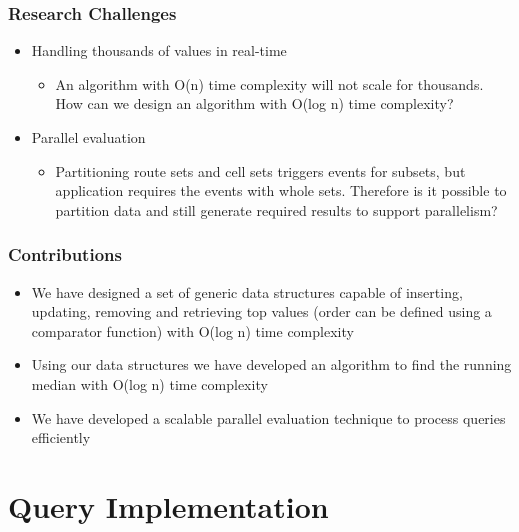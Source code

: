\documentclass[]{beamer}
\begin{document}
\begin{frame}
\frametitle{Research Challenges}
\begin{itemize}
	\item Handling thousands of values in real-time
		\begin{itemize}
			\item An algorithm with O(n) time complexity will not scale for thousands. How can we design an algorithm with O(log n) time complexity?
		\end{itemize}
	\item Parallel evaluation
		\begin{itemize}
                        \item Partitioning route sets and cell sets triggers events for subsets, but application requires the events with whole sets. Therefore is it possible to partition data and still generate required results to support parallelism? 
                \end{itemize}
\end{itemize}

\end{frame}

\begin{frame}
\frametitle{Contributions}
\begin{itemize}
        \item We have designed a set of  generic data structures capable of inserting, updating, removing and retrieving top values (order can be defined using a comparator function) with O(log n) time complexity
        \item Using our data structures we have developed an algorithm to find the running median with O(log n) time complexity 
	\item We have developed a scalable parallel evaluation technique to process queries efficiently
\end{itemize}

\end{frame}

\section{Query Implementation}
\end{document}
